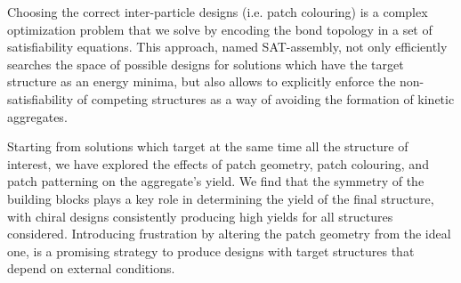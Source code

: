 \documentclass[a4paper, amsfonts, amssymb, amsmath, reprint, showkeys, nofootinbib, oneside]{revtex4-1}
\begin{document}
Choosing the correct inter-particle designs (i.e. patch colouring) is a complex optimization problem that we solve by encoding the bond topology in a set of satisfiability equations. This approach, named SAT-assembly, not only efficiently searches the space of possible designs for solutions which have the target structure as an energy minima, but also allows to explicitly enforce the non-satisfiability of competing structures as a way of avoiding the formation of kinetic aggregates.

Starting from solutions which target at the same time all the structure of interest, we have explored the effects of patch geometry, patch colouring, and patch patterning on the aggregate's yield. We find that the symmetry of the building blocks plays a key role in determining the yield of the final structure, with chiral designs consistently producing high yields for all structures considered. Introducing frustration by altering the patch geometry from the ideal one, is a promising strategy to produce designs with target structures that depend on external conditions.



\end{document}
